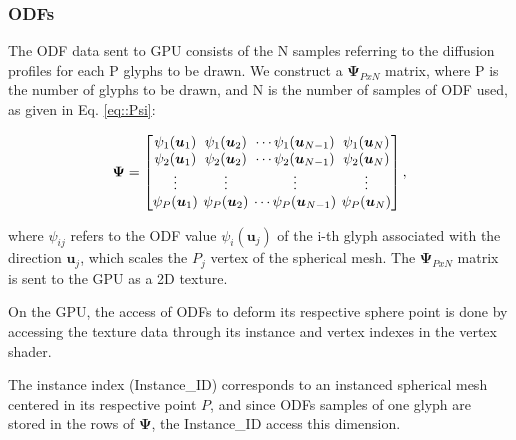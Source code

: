 \documentclass[twoside,twocolumn,10pt]{article}
\begin{document}



\subsubsection{ODFs}

The ODF data sent to GPU consists of the N samples referring to the diffusion profiles for each P glyphs to be drawn. We construct a $\bm{\Psi}_{PxN}$ matrix, where P is the number of glyphs to be drawn, and N is the number of samples of ODF used, as given in Eq. \ref{eq::Psi}:

\begin{equation}
\label{eq::Psi}
\bm{\Psi} = 
\begingroup %
\setlength\arraycolsep{2pt}
\begin{bmatrix} 
    \psi_1(\bm{u}_1) & \psi_1(\bm{u}_2) & \cdots \psi_1(\bm{u}_{N-1}) & \psi_1(\bm{u}_{N})  \\    
     \psi_2(\bm{u}_1)& \psi_2(\bm{u}_2) & \cdots \psi_2(\bm{u}_{N-1}) & \psi_2(\bm{u}_{N}) \\
    \vdots & \vdots & \vdots & \vdots  \\    
     \psi_P(\bm{u}_1)&\psi_P(\bm{u}_2) & \cdots \psi_P(\bm{u}_{N-1}) & \psi_P(\bm{u}_{N})
\end{bmatrix}, 
\endgroup
\end{equation}

where $\psi_{ij}$ refers to the ODF value $\psi_i(\bm{u}_j)$ of the i-th glyph associated with the direction $\bm{u}_j$, which scales the $P_j$ vertex of the spherical mesh. The $\bm{\Psi}_{PxN}$ matrix is sent to the GPU as a 2D texture.

On the GPU, the access of ODFs to deform its respective sphere point is done by accessing the texture data through its instance and vertex indexes in the vertex shader.

The instance index (Instance\_ID) corresponds to an instanced spherical mesh centered in its respective point $P$, and since ODFs samples of one glyph are stored in the rows of $\bm{\Psi}$, the Instance\_ID access this dimension.
\end{document}
